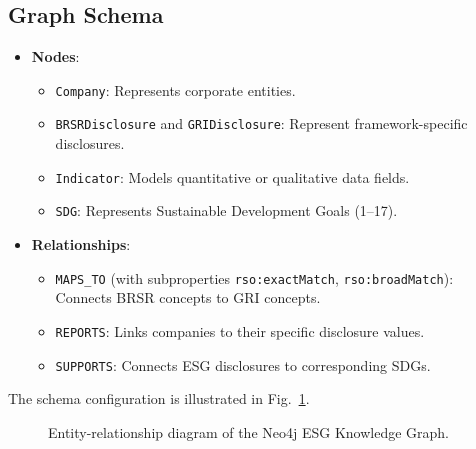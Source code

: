 \documentclass[journal,compsoc]{IEEEtran}
\begin{document}
\begin{itemize}
\begin{table}[t]
\begin{itemize}
\subsection{Graph Schema}
\begin{itemize}
    \item \textbf{Nodes}:
        \begin{itemize}
            \item \texttt{Company}: Represents corporate entities.
            \item \texttt{BRSRDisclosure} and \texttt{GRIDisclosure}: Represent framework-specific disclosures.
            \item \texttt{Indicator}: Models quantitative or qualitative data fields.
            \item \texttt{SDG}: Represents Sustainable Development Goals (1--17).
        \end{itemize}
    \item \textbf{Relationships}:
        \begin{itemize}
            \item \texttt{MAPS\_TO} (with subproperties \texttt{rso:exactMatch}, \texttt{rso:broadMatch}): Connects BRSR concepts to GRI concepts.
            \item \texttt{REPORTS}: Links companies to their specific disclosure values.
            \item \texttt{SUPPORTS}: Connects ESG disclosures to corresponding SDGs.
        \end{itemize}
\end{itemize}

The schema configuration is illustrated in Fig.~\ref{fig:kg}.

\begin{figure}[h]
\centering
{}
\caption{Entity-relationship diagram of the Neo4j ESG Knowledge Graph.}
\label{fig:kg}
\end{figure}


\end{itemize}
\end{table}
\end{itemize}
\end{document}
